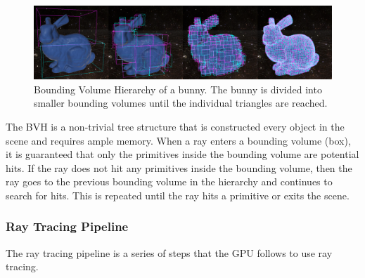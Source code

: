 \documentclass[12pt]{article}
\begin{document}
\begin{figure}[H]
    \includegraphics[scale=0.22]{BVH-Visualization}
    \caption{
        Bounding Volume Hierarchy of a bunny. 
        The bunny is divided into smaller bounding volumes until the individual triangles are reached.
        \parencite{Medium:BVH-Visualization}
        }
    \label{fig:BVH-Visualization}
\end{figure}

The BVH is a non-trivial tree structure that is constructed every object in the scene and requires ample memory.
When a ray enters a bounding volume (box), it is guaranteed that only the primitives inside the bounding volume are potential hits.
If the ray does not hit any primitives inside the bounding volume, then the ray goes to the previous bounding volume in the hierarchy and continues
to search for hits. This is repeated until the ray hits a primitive or exits the scene.

\subsubsection{Ray Tracing Pipeline}

The ray tracing pipeline is a series of steps that the GPU follows to use ray tracing.
\end{document}
